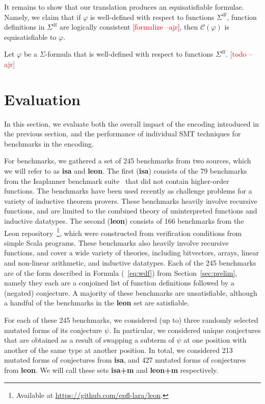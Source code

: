 \documentclass[runningheads,a4paper]{llncs}
\newcommand{\conv}{\mathcal{C}}
\newcommand{\sfundefs}[1]{#1^\mathrm{df}}
\newcommand{\rem}[1]{\textcolor{red}{[#1]}}
\newcommand{\ajr}[1]{\rem{#1 --ajr}}
\begin{document}
It remains to show that our translation produces an equisatisfiable formulae.
Namely,
we claim that if $\varphi$ is well-defined with respect to functions $\sfundefs{\Sigma}$,
function definitions in $\sfundefs{\Sigma}$ are logically consistent \ajr{formalize},
then $\conv(\varphi)$ is equisatisfiable to $\varphi$.

\begin{lemma}
Let $\varphi$ be a $\Sigma$-formula that is well-defined with respect to functions $\sfundefs{\Sigma}$.
\ajr{todo}
\end{lemma}

\section{Evaluation}

In this section, we evaluate both 
the overall impact of the encoding introduced in the previous section, and
the performance of individual SMT techniques for benchmarks in the encoding.

For benchmarks, we gathered a set of 245 benchmarks from two sources, which we will refer to as {\bf isa} and {\bf leon}.
The first ({\bf isa}) consists of the 79 benchmarks from the Isaplanner benchmark suite~\cite{DBLP:conf/itp/JohanssonDB10} that did not contain higher-order functions.
The benchmarks have been used recently as challenge problems for a variety of inductive theorem provers.
These benchmarks heavily involve recursive functions, and are limited to the combined theory of uninterpreted functions and inductive datatypes.
The second ({\bf leon}) consists of 166 benchmarks from the Leon repository~\footnote{Available at \url{https://github.com/epfl-lara/leon}.},
which were constructed from verification conditions from simple Scala programs.
These benchmarks also heavily involve recursive functions, 
and cover a wide variety of theories, including bitvectors, arrays, linear and non-linear arithmetic, and inductive datatypes.
Each of the 245 benchmarks are of the form described in Formula (~\ref{eq:wdf}) from Section~\ref{sec:prelim},
namely they each are a conjoined list of function definitions followed by a (negated) conjecture.
A majority of these benchmarks are unsatisfiable, although a handful of the benchmarks in the {\bf leon} set are satisfiable.

For each of these 245 benchmarks, we considered (up to) three randomly selected mutated forms of its conjecture $\psi$.
In particular, we considered unique conjectures that are obtained as a result of swapping a subterm of $\psi$ at one position
with another of the same type at another position.
In total, we considered 213 mutated forms of conjectures from {\bf isa}, and 427 mutated forms of conjectures from {\bf leon}.
We will call these sets {\bf isa+m} and {\bf leon+m} respectively.
\end{document}
